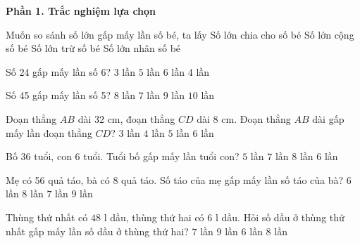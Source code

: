 \textbf{Phần 1. Trắc nghiệm lựa chọn}

\begin{ex} %
Muốn so sánh số lớn gấp mấy lần số bé, ta lấy
\choice
{\True Số lớn chia cho số bé}
{Số lớn cộng số bé}
{Số lớn trừ số bé}
{Số lớn nhân số bé}
\end{ex}

\begin{ex} %
Số 24 gấp mấy lần số 6?
\choice
{$3$ lần}
{$5$ lần}
{$6$ lần}
{\True $4$ lần}
\end{ex}

\begin{ex} %
Số 45 gấp mấy lần số 5?
\choice
{$8$ lần}
{$7$ lần}
{\True $9$ lần}
{$10$ lần}
\end{ex}

\begin{ex} %
Đoạn thẳng $AB$ dài $32\text{ cm}$, đoạn thẳng $CD$ dài $8\text{ cm}$. Đoạn thẳng $AB$ dài gấp mấy lần đoạn thẳng $CD$?
\choice
{$3$ lần}
{\True $4$ lần}
{$5$ lần}
{$6$ lần}
\end{ex}

\begin{ex} %
Bố 36 tuổi, con 6 tuổi. Tuổi bố gấp mấy lần tuổi con?
\choice
{$5$ lần}
{$7$ lần}
{$8$ lần}
{\True $6$ lần}
\end{ex}

\begin{ex} %
Mẹ có 56 quả táo, bà có 8 quả táo. Số táo của mẹ gấp mấy lần số táo của bà?
\choice
{$6$ lần}
{$8$ lần}
{\True $7$ lần}
{$9$ lần}
\end{ex}

\begin{ex} %
Thùng thứ nhất có $48\text{ l}$ dầu, thùng thứ hai có $6\text{ l}$ dầu. Hỏi số dầu ở thùng thứ nhất gấp mấy lần số dầu ở thùng thứ hai?
\choice
{$7$ lần}
{$9$ lần}
{$6$ lần}
{\True $8$ lần}
\end{ex}


